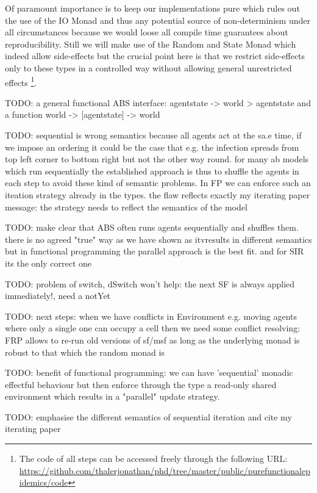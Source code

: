 Of paramount importance is to keep our implementations pure which rules out the use of the IO Monad and thus any potential source of non-determinism under all circumstances because we would loose all compile time guarantees about reproducibility. Still we will make use of the Random and State Monad which indeed allow side-effects but the crucial point here is that we restrict side-effects only to these types in a controlled way without allowing general unrestricted effects
\footnote{The code of all steps can be accessed freely through the following URL: \url{https://github.com/thalerjonathan/phd/tree/master/public/purefunctionalepidemics/code}}.

TODO: a general functional ABS interface: agentstate -> world > agentstate and a function world -> [agentstate] -> world

TODO: sequential is wrong semantics because all agents act at the sa.e time, if we impose an ordering it could be the case that e.g. the infection spreads from top left corner to bottom right but not the other way round. for many ab models which run sequentially the established approach is thus to shuffle the agents in each step to avoid these kind of semantic problems. In FP we can enforce such an iteation strategy already in the types. the flaw reflects exactly my iterating paper message: the strategy needs to reflect the semantics of the model

TODO: make clear that ABS often runs agents sequentially and shuffles them. there is no agreed "true" way as we have shown as itvresults in different semantics but in  functional programming the parallel approach is the best fit. and for SIR its the only correct one

TODO: problem of switch, dSwitch won't help: the next SF is always applied immediately!, need a notYet

TODO: next steps: when we have conflicts in Environment e.g. moving agents where only a single one can occupy a cell then we need some conflict resolving: FRP allows to re-run old versions of sf/msf as long as the underlying monad is robust to that which the random monad is

TODO: benefit of functional programming: we can have 'sequential' monadic effectful behaviour but then enforce through the type a read-only shared environment which results in a "parallel" update strategy.

TODO: emphasise the different semantics of sequential iteration and cite my iterating paper 

